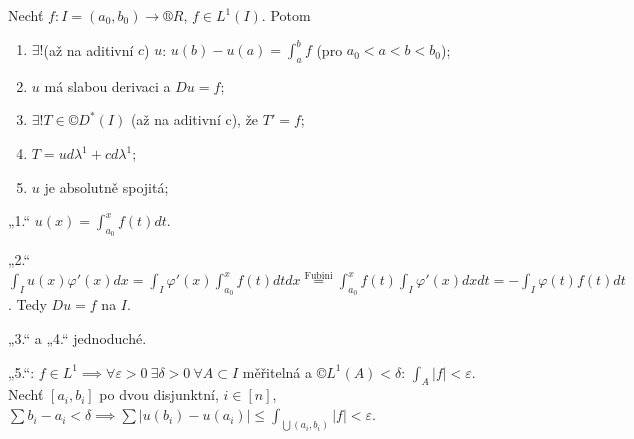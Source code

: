 \documentclass[12pt]{article}					%
\begin{document}
\begin{veta}
	Nechť $f: I = (a_0, b_0) \rightarrow ®R$, $f \in L^1(I)$. Potom
	\begin{enumerate}
		\item $\exists!$(až na aditivní $c$) $u$: $u(b) - u(a) = \int_a^b f$ (pro $a_0 < a < b < b_0$);
		\item $u$ má slabou derivaci a $Du = f$;
		\item $\exists!T \in ©D^*(I)$ (až na aditivní c), že $T' = f$;
		\item $T = udλ^1 + c dλ^1$;
		\item $u$ je absolutně spojitá;
	\end{enumerate}

	\begin{dukazin}
		„1.“ $u(x) = \int_{a_0}^x f(t) dt$.

		„2.“ $\int_I u(x) φ'(x) dx = \int_I φ'(x) \int_{a_0}^x f(t) dt dx \overset{\text{Fubini}}= \int_{a_0}^x f(t) \int_I φ'(x) dx dt = - \int_I φ(t) f(t) dt$. Tedy $Du = f$ na $I$.

		„3.“ a „4.“ jednoduché.

		„5.“: $f \in L^1 \implies \forall ε > 0\ \exists δ > 0\ \forall A \subset I$ měřitelná a $©L^1(A) < δ$: $\int_A |f| < ε$. Nechť $[a_i, b_i]$ po dvou disjunktní, $i \in [n]$, $\sum b_i - a_i < δ \implies \sum |u(b_i) - u(a_i)| ≤ \int_{\bigcup (a_i, b_i)} |f| < ε$.
	\end{dukazin}
\end{veta}
\end{document}
